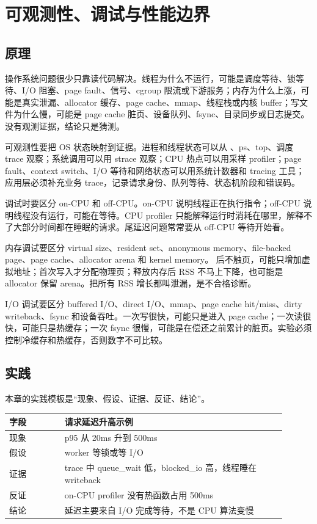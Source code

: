\chapter{可观测性、调试与性能边界}

\section{原理}

操作系统问题很少只靠读代码解决。线程为什么不运行，可能是调度等待、锁等待、I/O 阻塞、page fault、信号、cgroup 限流或下游服务；内存为什么上涨，可能是真实泄漏、allocator 缓存、page cache、mmap、线程栈或内核 buffer；写文件为什么慢，可能是 page cache 脏页、设备队列、fsync、目录同步或日志提交。没有观测证据，结论只是猜测。

可观测性要把 OS 状态映射到证据。进程和线程状态可以从 、ps、top、调度 trace 观察；系统调用可以用 strace 观察；CPU 热点可以用采样 profiler；page fault、context switch、I/O 等待和网络状态可以用系统计数器和 tracing 工具；应用层必须补充业务 trace，记录请求身份、队列等待、状态机阶段和错误码。

调试时要区分 on-CPU 和 off-CPU。on-CPU 说明线程正在执行指令；off-CPU 说明线程没有运行，可能在等待。CPU profiler 只能解释运行时消耗在哪里，解释不了大部分时间都在睡眠的请求。尾延迟问题常常要从 off-CPU 等待开始看。

内存调试要区分 virtual size、resident set、anonymous memory、file-backed page、page cache、allocator arena 和 kernel memory。 后不触页，可能只增加虚拟地址；首次写入才分配物理页；释放内存后 RSS 不马上下降，也可能是 allocator 保留 arena。把所有 RSS 增长都叫泄漏，是不合格诊断。

I/O 调试要区分 buffered I/O、direct I/O、mmap、page cache hit/miss、dirty writeback、fsync 和设备吞吐。一次写很快，可能只是进入 page cache；一次读很快，可能只是热缓存；一次 fsync 很慢，可能是在偿还之前累计的脏页。实验必须控制冷缓存和热缓存，否则数字不可比较。

\section{实践}

本章的实践模板是“现象、假设、证据、反证、结论”。

\begin{longtable}{|p{0.18\linewidth}|p{0.72\linewidth}|}
\toprule
字段 & 请求延迟升高示例 \\
\midrule
现象 & p95 从 20ms 升到 500ms \\\tablerowrule
假设 & worker 等锁或等 I/O \\\tablerowrule
证据 & trace 中 queue\_wait 低，blocked\_io 高，线程睡在 writeback \\\tablerowrule
反证 & on-CPU profiler 没有热函数占用 500ms \\\tablerowrule
结论 & 延迟主要来自 I/O 完成等待，不是 CPU 算法变慢 \\
\bottomrule
\end{longtable}

